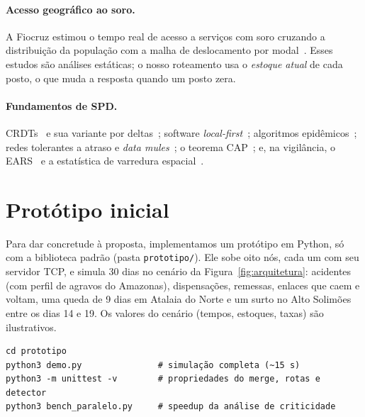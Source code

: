 \documentclass[a4paper,12pt]{article}
\begin{document}
\paragraph{Acesso geográfico ao soro.} A Fiocruz estimou o tempo real de
acesso a serviços com soro cruzando a distribuição da população com a malha
de deslocamento por modal~\cite{fiocruz2024}. Esses estudos são análises
estáticas; o nosso roteamento usa o \emph{estoque atual} de cada posto, o que
muda a resposta quando um posto zera.

\paragraph{Fundamentos de SPD.} CRDTs~\cite{shapiro2011} e sua variante por
deltas~\cite{almeida2018}; software \emph{local-first}~\cite{kleppmann2019};
algoritmos epidêmicos~\cite{demers1987,decandia2007}; redes tolerantes a
atraso e \emph{data mules}~\cite{fall2003,pentland2004}; o teorema
CAP~\cite{gilbert2002}; e, na vigilância, o EARS~\cite{hutwagner2003} e a
estatística de varredura espacial~\cite{kulldorff1997}.

\section{Protótipo inicial}
\label{sec:prototipo}

Para dar concretude à proposta, implementamos um protótipo em Python, só com a
biblioteca padrão (pasta \texttt{prototipo/}). Ele sobe oito nós, cada um com
seu servidor TCP, e simula 30 dias no cenário da
Figura~\ref{fig:arquitetura}: acidentes (com perfil de agravos do Amazonas),
dispensações, remessas, enlaces que caem e voltam, uma queda de 9 dias em
Atalaia do Norte e um surto no Alto Solimões entre os dias 14 e 19. Os
valores do cenário (tempos, estoques, taxas) são ilustrativos.

\begin{lstlisting}
cd prototipo
python3 demo.py               # simulação completa (~15 s)
python3 -m unittest -v        # propriedades do merge, rotas e detector
python3 bench_paralelo.py     # speedup da análise de criticidade
\end{lstlisting}
\end{document}
